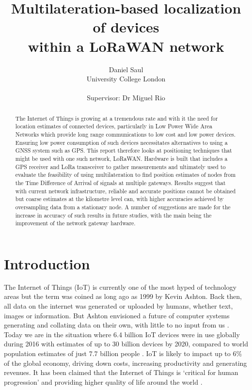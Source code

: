 \documentclass[a4paper]{report}
\title{Multilateration-based localization of devices\\within a LoRaWAN network}
\author{Daniel Saul\\University College London\\ \\Supervisor: Dr Miguel Rio}
\begin{document}
    \maketitle

\pagestyle{fancy}

\begin{abstract}

  The Internet of Things is growing at a tremendous rate and with it the need for location estimates of connected devices, particularly in Low Power Wide Area Networks which provide long range communications to low cost and low power devices. Ensuring low power consumption of such devices necessitates alternatives to using a GNSS system such as GPS. This report therefore looks at positioning techniques that might be used with one such network, LoRaWAN. Hardware is built that includes a GPS receiver and LoRa transceiver to gather measurements and ultimately used to evaluate the feasibility of using multilateration to find position estimates of nodes from the Time Difference of Arrival of signals at multiple gateways. Results suggest that with current network infrastructure, reliable and accurate positions cannot be obtained but coarse estimates at the kilometre level can, with higher accuracies achieved by oversampling data from a stationary node. A number of suggestions are made for the increase in accuracy of such results in future studies, with the main being the improvement of the network gateway hardware.

\end{abstract}

\tableofcontents


\chapter{Introduction}

  The Internet of Things (IoT) is currently one of the most hyped of technology areas but the term was coined as long ago as 1999 by Kevin Ashton. Back then, all data on the internet was generated or uploaded by humans, whether text, images or information. But Ashton envisioned a future of computer systems generating and collating data on their own, with little to no input from us \cite{Ashton2009}. Today we are in the situation where 6.4 billion IoT devices were in use globally during 2016 \cite{Gartner64} with estimates of up to 30 billion devices by 2020, compared to world population estimates of just 7.7 billion people \cite{Blanter}. IoT is likely to impact up to 6\% of the global economy, driving down costs, increasing productivity and generating revenues. It has been claimed that the Internet of Things is `critical for human progression' and providing higher quality of life around the world \cite{Evans2011}.
\end{document}
